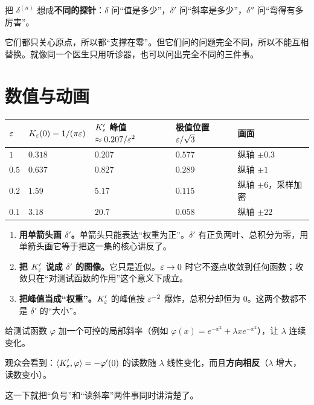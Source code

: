 \begin{ideabox}[一个能救场的比喻]
把 $\delta^{(n)}$ 想成\textbf{不同的探针}：$\delta$ 问“值是多少”，$\delta'$ 问“斜率是多少”，$\delta''$ 问“弯得有多厉害”。

它们都只关心原点，所以都“支撑在零”。但它们问的问题完全不同，所以不能互相替换。就像同一个医生只用听诊器，也可以问出完全不同的三件事。
\end{ideabox}

\section{数值与动画}

\begin{center}
\small
\renewcommand{\arraystretch}{1.35}
\begin{tabularx}{\textwidth}{@{}L{1.4cm}L{3.4cm}L{3.2cm}L{3.0cm}Y@{}}
\toprule
$\varepsilon$ & $K_\varepsilon(0)=1/(\pi\varepsilon)$ & $K_\varepsilon'$ 峰值 $\approx0.207/\varepsilon^{2}$ & 极值位置 $\varepsilon/\sqrt3$ & 画面 \\
\midrule
$1$ & $0.318$ & $0.207$ & $0.577$ & 纵轴 $\pm0.3$ \\
$0.5$ & $0.637$ & $0.827$ & $0.289$ & 纵轴 $\pm1$ \\
$0.2$ & $1.59$ & $5.17$ & $0.115$ & 纵轴 $\pm6$，采样加密 \\
$0.1$ & $3.18$ & $20.7$ & $0.058$ & 纵轴 $\pm22$ \\
\bottomrule
\end{tabularx}
\end{center}

\begin{warnbox}[三个动画陷阱]
\begin{enumerate}[leftmargin=1.4em,itemsep=0.3em]
\item \textbf{用单箭头画 $\delta'$。}单箭头只能表达“权重为正”。$\delta'$ 有正负两叶、总积分为零，用单箭头画它等于把这一集的核心讲反了。
\item \textbf{把 $K_\varepsilon'$ 说成 $\delta'$ 的图像。}它只是近似。$\varepsilon\to0$ 时它不逐点收敛到任何函数；收敛只在“对测试函数的作用”这个意义下成立。
\item \textbf{把峰值当成“权重”。}$K_\varepsilon'$ 的峰值按 $\varepsilon^{-2}$ 爆炸，总积分却恒为 $0$。这两个数都不是 $\delta'$ 的“大小”。
\end{enumerate}
\end{warnbox}

\begin{scriptbox}[动画要点 02-D]
给测试函数 $\varphi$ 加一个可控的局部斜率（例如 $\varphi(x)=e^{-x^{2}}+\lambda x e^{-x^{2}}$），让 $\lambda$ 连续变化。

观众会看到：$\langle K_\varepsilon',\varphi\rangle=-\varphi'(0)$ 的读数随 $\lambda$ 线性变化，而且\textbf{方向相反}（$\lambda$ 增大，读数变小）。

这一下就把“负号”和“读斜率”两件事同时讲清楚了。
\end{scriptbox}

